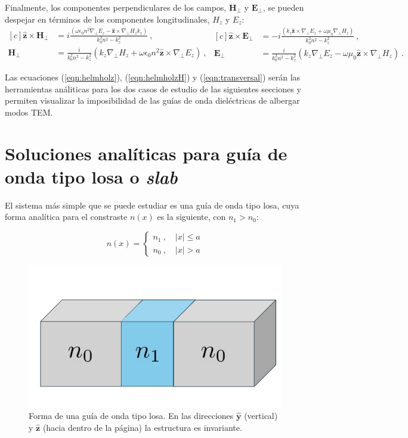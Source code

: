 Finalmente, los componentes perpendiculares de los campos, $\textbf{H}_\perp$ y $\textbf{E}_\perp$, se pueden despejar en términos de los componentes longitudinales, $H_z$ y $E_z$:
\begin{equation}
\begin{aligned}[c]
 \hat{\textbf{z}} \times \textbf{H}_\perp &= i\frac{(\omega\epsilon_0 n^2 \nabla_\perp E_z  - \hat{\textbf{z}} \times \nabla_\perp H_z k_z)}{k_0^2 n^2 - k_z^2} \ ,
 \\
\textbf{H}_\perp &= \frac{i}{k_0^2 n^2 - k_z^2}\left(k_z\nabla_\perp H_z + \omega \epsilon_0 n^2\hat{\textbf{z}} \times \nabla_\perp E_z\right) \ ,
\end{aligned}
\begin{aligned}[c]
	\hat{\textbf{z}} \times \textbf{E}_\perp &= -i\frac{(k_z\hat{\textbf{z}} \times \nabla_\perp E_z + \omega\mu_0 \nabla_\perp H_z)  }{k_0^2 n^2 - k_z^2} \ ,
	\\
\textbf{E}_\perp &= \frac{i}{k_0^2 n^2 - k_z^2}\left(k_z \nabla_\perp E_z - \omega\mu_0 \hat{\textbf{z}} \times \nabla_\perp H_z\right) \ . \label{eqn:transversal}
\end{aligned}
\end{equation}

Las ecuaciones (\ref{eqn:helmholz}), (\ref{eqn:helmholzH}) y (\ref{eqn:transversal}) serán las herramientas análiticas para los dos casos de estudio de las siguientes secciones y permiten visualizar la imposibilidad de las guías de onda dieléctricas de albergar modos TEM.
\section{Soluciones analíticas para guía de onda tipo losa o \textit{slab}}

El sistema más simple que se puede estudiar es una guía de onda tipo losa, cuya forma analítica para el constraste $n(x)$ es la siguiente, con $n_1 > n_0$:

\begin{equation*}
	n(x) = \left\{\begin{matrix}
	n_1 \ , \quad |x| \le a
	\\
	n_0 \ , \quad |x| > a
 	\end{matrix}\right.
\end{equation*}

\begin{figure}[H]
	\centering
	\includegraphics[width=0.6\linewidth]{media/slab.pdf}
	\caption[Forma de una guía de onda tipo losa.]{Forma de una guía de onda tipo losa. En las direcciones $\mathbf{\hat{y}}$ (vertical) y $\mathbf{\hat{z}}$ (hacia dentro de la página) la estructura es invariante.}
\end{figure}

